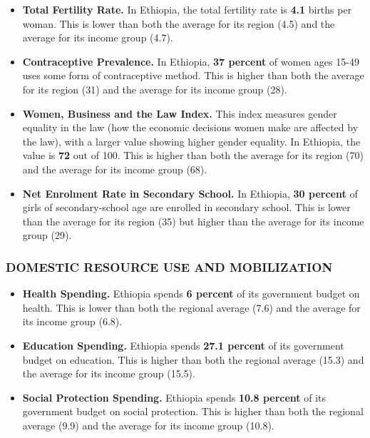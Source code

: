 \documentclass[9.2pt,twocolumn]{article}
\begin{document}
\begin{itemize}
\item
  \textbf{Total Fertility Rate.} In Ethiopia, the total fertility rate
  is \textbf{4.1} births per woman. This is lower than both the average
  for its region (4.5) and the average for its income group (4.7).
\item
  \textbf{Contraceptive Prevalence.} In Ethiopia, \textbf{37 percent} of
  women ages 15-49 uses some form of contraceptive method. This is
  higher than both the average for its region (31) and the average for
  its income group (28).
\item
  \textbf{Women, Business and the Law Index.} This index measures gender
  equality in the law (how the economic decisions women make are
  affected by the law), with a larger value showing higher gender
  equality. In Ethiopia, the value is \textbf{72} out of 100. This is
  higher than both the average for its region (70) and the average for
  its income group (68).
\item
  \textbf{Net Enrolment Rate in Secondary School.} In Ethiopia,
  \textbf{30 percent} of girls of secondary-school age are enrolled in
  secondary school. This is lower than the average for its region (35)
  but higher than the average for its income group (29).
\end{itemize}

\hypertarget{section-2}{%
\subsubsection{\texorpdfstring{\textcolor{bondiblue}{\textbf{D\small{OMESTIC RESOURCE USE AND MOBILIZATION}}}}{}}\label{section-2}}

\begin{itemize}
\item
  \textbf{Health Spending.} Ethiopia spends \textbf{6 percent} of its
  government budget on health. This is lower than both the regional
  average (7.6) and the average for its income group (6.8).
\item
  \textbf{Education Spending.} Ethiopia spends \textbf{27.1 percent} of
  its government budget on education. This is higher than both the
  regional average (15.3) and the average for its income group (15.5).
\item
  \textbf{Social Protection Spending.} Ethiopia spends \textbf{10.8
  percent} of its government budget on social protection. This is higher
  than both the regional average (9.9) and the average for its income
  group (10.8).
\end{itemize}
\end{document}
